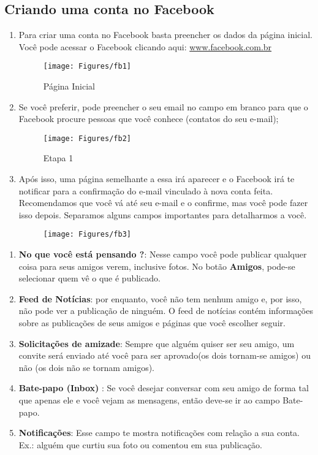 \documentclass[hidelinks,12pt]{article}
\begin{document}
	\subsection{Criando uma conta no Facebook}
		\begin{enumerate}
			\item Para criar uma conta no Facebook basta preencher os dados da página inicial. Você pode acessar o Facebook clicando aqui: \url{www.facebook.com.br}

			\begin{figure}[!h]
				\centering
				\texttt{[image: Figures/fb1]}
				\label{fig:paginafb}
				\caption{Página Inicial}
			\end{figure}

			\item Se você preferir, pode preencher o seu email no campo em branco para que o Facebook procure pessoas que você conhece (contatos do seu e-mail);

			\begin{figure}[!h]
				\centering
				\texttt{[image: Figures/fb2]}
				\label{fig:paginaf2}
				\caption{Etapa 1}
			\end{figure}

			\item Após isso, uma página semelhante a essa irá aparecer e o Facebook irá te notificar para a confirmação do e-mail vinculado à nova conta feita. Recomendamos que você vá até seu e-mail e o confirme, mas você pode fazer isso depois.
			Separamos alguns campos importantes para detalharmos a você.

			\begin{figure}[!h]
				\centering
				\texttt{[image: Figures/fb3]}
				\label{fig:paginaf3}
			\end{figure}

		\end{enumerate}

		\begin{enumerate}
			\item \textbf{No que você está pensando ?}: Nesse campo você pode publicar qualquer coisa para seus amigos verem, inclusive fotos. No botão \textbf{Amigos}, pode-se selecionar quem vê o que é publicado.
			\item \textbf{Feed de Notícias}: por enquanto, você não tem nenhum amigo e, por isso, não pode ver a publicação de ninguém. O feed de notícias contém informações sobre as publicações de seus amigos e páginas que você escolher seguir.
			\item \textbf{Solicitações de amizade}: Sempre que alguém quiser ser seu amigo, um convite será enviado até você para ser aprovado(os dois tornam-se amigos) ou não (os dois não se tornam amigos).
			\item \textbf{Bate-papo (Inbox) }: Se você desejar conversar com seu amigo de forma tal que apenas ele e você vejam as mensagens, então deve-se ir ao campo Bate-papo.
			\item \textbf{Notificações}: Esse campo te mostra notificações com relação a sua conta. Ex.: alguém que curtiu sua foto ou comentou em sua publicação.
		\end{enumerate}
\end{document}
